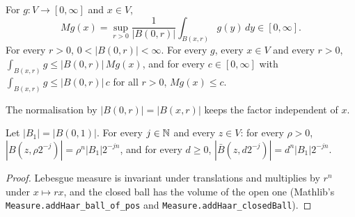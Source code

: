 \begin{definition}
\label{def:maximal-function}
\leanok
For $g : V \to [0, \infty]$ and $x \in V$,
\[
  M g(x) = \sup_{r > 0} \frac{1}{|B(0, r)|} \int_{B(x, r)} g(y) \, dy \in [0, \infty] .
\]
For every $r > 0$, $0 < |B(0, r)| < \infty$. For every $g$, every $x \in V$ and every $r > 0$,
$\int_{B(x,r)} g \leq |B(0,r)| \, M g(x)$, and for every $c \in [0, \infty]$ with
$\int_{B(x,r)} g \leq |B(0,r)| \, c$ for all $r > 0$, $M g(x) \leq c$.
\end{definition}

The normalisation by $|B(0, r)| = |B(x, r)|$ keeps the factor independent of $x$.

\begin{lemma}
\label{lem:dyadic-ball-volume}
\leanok
Let $|B_1| = |B(0, 1)|$. For every $j \in \mathbb{N}$ and every $z \in V$: for every $\rho > 0$,
$|B(z, \rho 2^{-j})| = \rho^n |B_1| 2^{-jn}$, and for every $d \geq 0$,
$|\bar B(z, d 2^{-j})| = d^n |B_1| 2^{-jn}$.
\end{lemma}

\begin{proof}
\leanok
Lebesgue measure is invariant under translations and multiplies by $r^n$ under $x \mapsto r x$,
and the closed ball has the volume of the open one (Mathlib's
\texttt{Measure.\allowbreak addHaar\_\allowbreak ball\_\allowbreak of\_\allowbreak pos} and
\texttt{Measure.\allowbreak addHaar\_\allowbreak closedBall}).
\end{proof}

